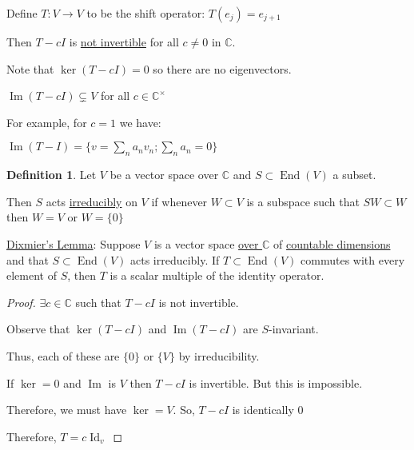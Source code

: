 \documentclass{article}
\theoremstyle{definition}
\newtheorem{definition}{Definition}
\begin{document}
Define \(T:V \to V\) to be the shift operator: \(T(e_j) = e_{j+1}\) 

Then \(T - cI\) is \underline{not invertible} for all \(c\neq 0\) in \(\mathbb{C}\).

Note that \(\ker(T-cI) = 0\) so there are no eigenvectors. 

\(\operatorname{Im}(T - cI) \subsetneq V\) for all \(c\in \mathbb{C} ^\times \) 

For example, for \(c = 1\) we have:

\(\operatorname{Im}(T - I) = \{ v = \sum_{n} a_n v_n ; \sum_{n} a_n = 0 \} \) 

\begin{definition}
    Let \(V\) be a vector space over \(\mathbb{C}\) and \(S \subset \operatorname{End}(V)\) a subset.
    
    Then \(S\) acts \underline{irreducibly} on \(V\) if whenever \(W \subset V\) is a subspace such that \(SW \subset W\) then \(W = V\) or \(W = \{ 0 \}\)   
\end{definition}

\underline{Dixmier's Lemma}: Suppose \(V\) is a vector space \underline{over \(\mathbb{C}\)} of \underline{countable dimensions} and that \(S \subset \operatorname{End}(V)\) acts irreducibly. If \(T \subset \operatorname{End}(V)\) commutes with every element of \(S\), then \(T\) is a scalar multiple of the identity operator.

\begin{proof}
    \(\exists c\in\mathbb{C}\) such that \(T - cI\) is not invertible.
    
    Observe that \(\ker (T - cI)\) and \(\operatorname{Im}(T - cI) \) are \(S\)-invariant.

    Thus, each of these are \(\{ 0 \}\) or \(\{ V \}\) by irreducibility.
    
    If \(\ker = 0\) and \(\operatorname{Im}\) is \(V\) then \(T - cI\) is invertible. But this is impossible.
    
    Therefore, we must have \(\ker = V\). So, \(T - cI\) is identically \(0\) 
    
    Therefore, \(T = c \operatorname{Id}_v\) 
\end{proof}
\end{document}
